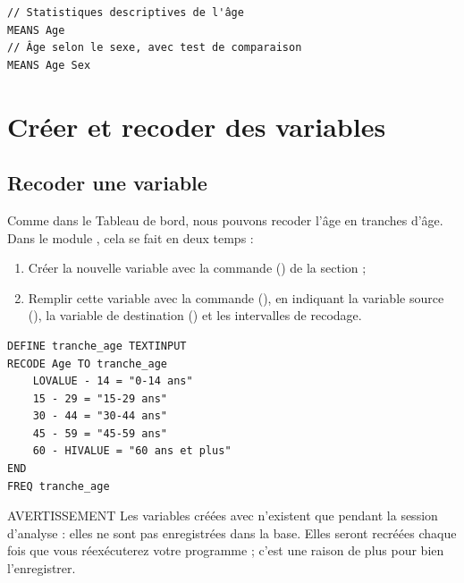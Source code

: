 \begin{tcolorbox}
	\begin{lstlisting}[language=EPIscript, style=mystyle, caption={Paramètres de position et de dispersion}, label=lst:means]
// Statistiques descriptives de l'âge
MEANS Age
// Âge selon le sexe, avec test de comparaison
MEANS Age Sex
	\end{lstlisting}
\end{tcolorbox}

\section{Créer et recoder des variables}

\subsection{Recoder une variable}

Comme dans le Tableau de bord, nous pouvons recoder l'âge en tranches d'âge. Dans le module , cela se fait en deux temps :
\begin{enumerate}
	\item Créer la nouvelle variable avec la commande  () de la section  ;
	\item Remplir cette variable avec la commande  (), en indiquant la variable source (), la variable de destination () et les intervalles de recodage.
\end{enumerate}

\begin{tcolorbox}
	\begin{lstlisting}[language=EPIscript, style=mystyle, caption={Recodage de l'âge en tranches d'âge}, label=lst:recode]
DEFINE tranche_age TEXTINPUT
RECODE Age TO tranche_age
	LOVALUE - 14 = "0-14 ans"
	15 - 29 = "15-29 ans"
	30 - 44 = "30-44 ans"
	45 - 59 = "45-59 ans"
	60 - HIVALUE = "60 ans et plus"
END
FREQ tranche_age
	\end{lstlisting}
\end{tcolorbox}

\begin{mybox}[colbacktitle=CAUTION]{\faFire{} AVERTISSEMENT}
Les variables créées avec  n'existent que pendant la session d'analyse : elles ne sont pas enregistrées dans la base. Elles seront recréées chaque fois que vous réexécuterez votre programme ; c'est une raison de plus pour bien l'enregistrer.
\end{mybox}

